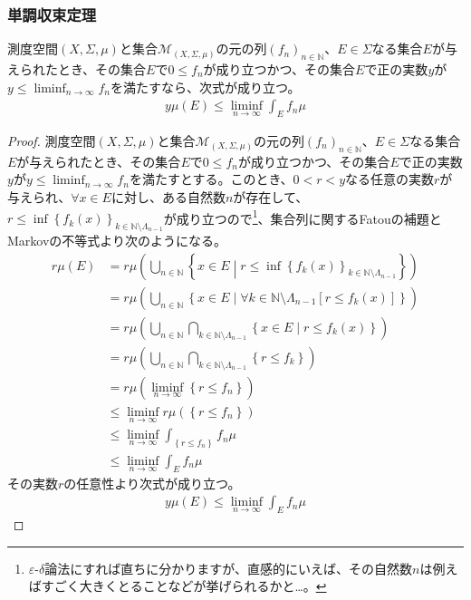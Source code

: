 \documentclass[dvipdfmx]{jsarticle}
\begin{document}
\subsubsection{単調収束定理}%
\begin{thm}\label{4.6.1.23}
測度空間$(X,\varSigma,\mu)$と集合$\mathcal{M}_{(X,\varSigma,\mu)}$の元の列$\left( f_{n} \right)_{n \in \mathbb{N}}$、$E \in \varSigma$なる集合$E$が与えられたとき、その集合$E$で$0 \leq f_{n}$が成り立つかつ、その集合$E$で正の実数$y$が$y \leq \liminf_{n \rightarrow \infty}f_{n}$を満たすなら、次式が成り立つ。
\begin{align*}
y\mu(E) \leq \liminf_{n \rightarrow \infty}{\int_{E} {f_{n}\mu}}
\end{align*}
\end{thm}
\begin{proof}
測度空間$(X,\varSigma,\mu)$と集合$\mathcal{M}_{(X,\varSigma,\mu)}$の元の列$\left( f_{n} \right)_{n \in \mathbb{N}}$、$E \in \varSigma$なる集合$E$が与えられたとき、その集合$E$で$0 \leq f_{n}$が成り立つかつ、その集合$E$で正の実数$y$が$y \leq \liminf_{n \rightarrow \infty}f_{n}$を満たすとする。このとき、$0 < r < y$なる任意の実数$r$が与えられ、$\forall x \in E$に対し、ある自然数$n$が存在して、$r \leq \inf\left\{ f_{k}(x) \right\}_{k \in \mathbb{N} \setminus \varLambda_{n - 1}}$が成り立つので\footnote{$\varepsilon $-$\delta $論法にすれば直ちに分かりますが、直感的にいえば、その自然数$n$は例えばすごく大きくとることなどが挙げられるかと…。}、集合列に関するFatouの補題とMarkovの不等式より次のようになる。
\begin{align*}
r\mu(E) &= r\mu\left( \bigcup_{n \in \mathbb{N}} \left\{ x \in E \middle| r \leq \inf\left\{ f_{k}(x) \right\}_{k \in \mathbb{N} \setminus \varLambda_{n - 1}} \right\} \right)\\
&= r\mu\left( \bigcup_{n \in \mathbb{N}} \left\{ x \in E \middle| \forall k \in \mathbb{N} \setminus \varLambda_{n - 1}\left[ r \leq f_{k}(x) \right] \right\} \right)\\
&= r\mu\left( \bigcup_{n \in \mathbb{N}} {\bigcap_{k \in \mathbb{N} \setminus \varLambda_{n - 1}} \left\{ x \in E \middle| r \leq f_{k}(x) \right\}} \right)\\
&= r\mu\left( \bigcup_{n \in \mathbb{N}} {\bigcap_{k \in \mathbb{N} \setminus \varLambda_{n - 1}} \left\{ r \leq f_{k} \right\}} \right)\\
&= r\mu\left( \liminf_{n \rightarrow \infty}\left\{ r \leq f_{n} \right\} \right)\\
&\leq \liminf_{n \rightarrow \infty}{r\mu\left( \left\{ r \leq f_{n} \right\} \right)}\\
&\leq \liminf_{n \rightarrow \infty}{\int_{\left\{ r \leq f_{n} \right\}} {f_{n}\mu}}\\
&\leq \liminf_{n \rightarrow \infty}{\int_{E} {f_{n}\mu}}
\end{align*}
その実数$r$の任意性より次式が成り立つ。
\begin{align*}
y\mu(E) \leq \liminf_{n \rightarrow \infty}{\int_{E} {f_{n}\mu}}
\end{align*}
\end{proof}
\end{document}
